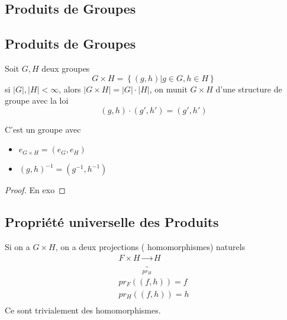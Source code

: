 \documentclass[../main.tex]{subfiles}
\begin{document}
\subsection{Produits de Groupes}

\subsection{Produits de Groupes}

\begin{defn}
Soit $G,H$ deux groupes 
\[ 
	G\times H = \left\{ ( g,h) | g\in G, h \in H \right\} 
\]
si $|G|, |H| < \infty $, alors $|G\times H| = |G| \cdot |H|$, on munit $G\times H$ d'une structure de groupe avec la loi
\[ 
	( g,h) \cdot ( g',h') = ( g',h') 
\]

\end{defn}
\begin{lemma}
C'est un groupe avec
\begin{itemize}
	\item $e_{G\times H} = ( e_G, e_H) $ 
	\item $( g,h) ^{-1}= ( g^{-1},h^{-1}) $
\end{itemize}

\end{lemma}
\begin{proof}
En exo
\end{proof}

\subsection{Propriété universelle des Produits}
Si on a $G\times H$, on a deux projections ( homomorphismes)  naturels
\begin{align*}
F\times H \underbrace{\to}_{pr_H} H\\
pr_F( ( f,h) )  = f\\
pr_H( ( f,h) )  = h\\
\end{align*}
Ce sont trivialement des homomorphismes.
\end{document}
